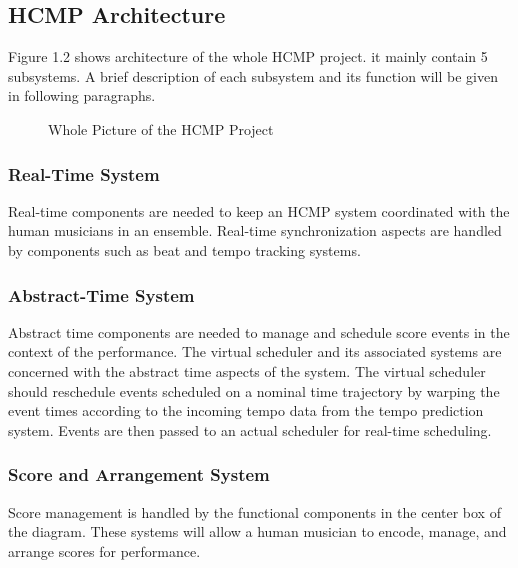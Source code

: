 \subsection{HCMP Architecture}
Figure 1.2 shows architecture of the whole HCMP project. it mainly contain 5 
subsystems. A brief description of each subsystem and its function will be
given in following paragraphs.
\begin{figure}[H] %
\caption{Whole Picture of the HCMP Project}
\label{fig:speciation}
\end{figure}

\subsubsection{Real-Time System}
Real-time components are needed to keep an HCMP system coordinated with
the human musicians in an ensemble. Real-time synchronization aspects are
handled by components such as beat and tempo tracking systems.

\subsubsection{Abstract-Time System}
Abstract time components are needed to manage and schedule score events in
the context of the performance. The virtual scheduler and its associated systems are
concerned with the abstract time aspects of the system. The virtual scheduler should
reschedule events scheduled on a nominal time trajectory by warping the event times
according to the incoming tempo data from the tempo prediction system. Events are
then passed to an actual scheduler for real-time scheduling.

\subsubsection{Score and Arrangement System}
Score management is handled by the functional components in the center box of
the diagram. These systems will allow a human musician to encode, manage, and
arrange scores for performance.

